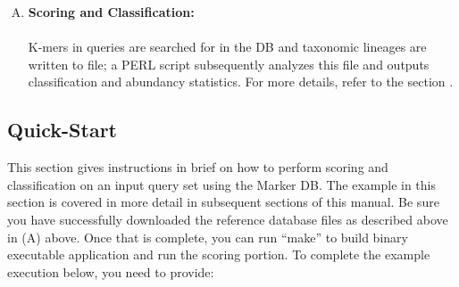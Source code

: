 \documentclass[11pt]{article}
\begin{document}
\begin{enumerate}[A.]
{     Additionally, we encourage users to install
     the DI-MMAP runtime (optional) if considering use of LMAT
     databases on flash-based storage.  Please see
     https://bitbucket.org/vanessen/di-mmap for more information.
     Accessing the database at run-time over a NFS mounted file system
     is not recommended.  

\begin{quote}
  {\it Tip:} If a ramdisk is not available on a large (512GB+) server,
  we recommend that the database be ``precopied'' into the system's
  buffer cache (from network attached or local HDD storage) prior to
  running LMAT.  LMAT uses memory mapped files so pages in the
  database are loaded on demand.  Regular system prefetching of pages
  under the memory-mapped approach is slow unless run from an SSD.
  The effectiveness of precopy can depend on your system's buffer
  cache policy: some evict pages early so the buffer will not hold the
  LMAT database from the precopy to the following LMAT execution.  To
  perform the ``precopy'':

 \texttt{\% cat <database-filename> > /dev/null}.
\end{quote}

}
  \item
{


  {\bf Scoring and Classification:}\\
  \\
   K-mers in queries are searched for in the DB
     and taxonomic lineages are written to file; a PERL script subsequently
     analyzes this file and outputs classification and abundancy statistics.  For more details, refer to the section .
}
\end{enumerate}

\subsection{Quick-Start}
\label{sec:quick-start}

This section gives instructions in brief on how to perform scoring and classification on an input query set using the Marker DB.  The example in this section is covered in more detail in subsequent sections of this manual.   Be sure you have successfully downloaded the reference database files as described above in  (A) above. Once that is complete, you can run ``make'' to build binary executable application and run the scoring portion.  To complete the example execution below, you need to provide: 
\end{document}
